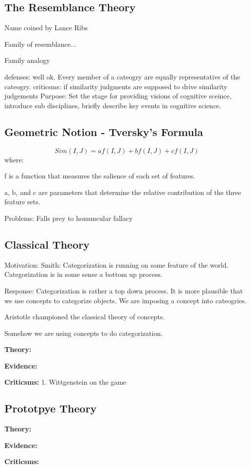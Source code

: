 \documentclass[twoside]{article}
\begin{document}
\subsection{The Resemblance Theory}
Name coined by Lance Ribs

Family of resemblance...

Family analogy

defenses:
well ok. Every member of a cateogry are equally representative of the cateogry.
criticsms:
if similarity judgments are supposed to drive similarity judgements
Purpose: Set the stage for providing visions of cognitive sceince, introduce
sub disciplines, briefly describe key events in cognitive science.


\subsection{Geometric Notion - Tversky's Formula}
$$ Sim(I, J) = af(I, J) + bf(I, J) + cf(I, J) $$
where:

f is a function that measures the salience of each set of features.

a, b,  and  c are  parameters  that  determine the relative contribution
of the three feature sets.

Problems: Falls prey to homuncular fallacy

\subsection{Classical Theory}
Motivation:
Smith: Categorization is running on some feature of the world. Categorization
is in some sense a bottom up process.

Response: Categorization is rather a top down process. It is more plausible that
we use concepts to categorize objects. We are imposing a concept into cateogries.


Aristotle championed the classical theory of concepts.

Somehow we are using concepts to do categorization.

\textbf{Theory: }

\textbf{Evidence: }

\textbf{Criticsms: }
1. Wittgenstein on the game

\subsection{Prototpye Theory}

\textbf{Theory: }

\textbf{Evidence: }

\textbf{Criticsms: }
\end{document}
